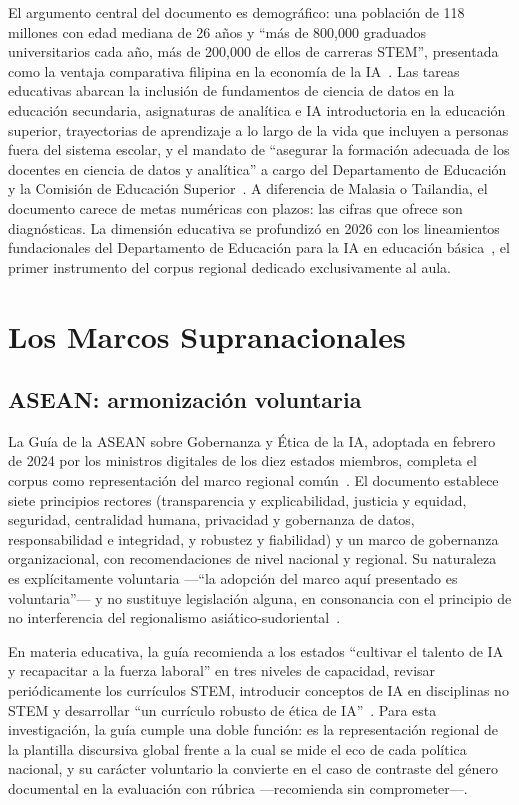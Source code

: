 El argumento central del documento es demográfico: una población de 118 millones con edad mediana de 26 años y ``más de 800,000 graduados universitarios cada año, más de 200,000 de ellos de carreras STEM'', presentada como la ventaja comparativa filipina en la economía de la IA~\citep{philippines2024naisr}. Las tareas educativas abarcan la inclusión de fundamentos de ciencia de datos en la educación secundaria, asignaturas de analítica e IA introductoria en la educación superior, trayectorias de aprendizaje a lo largo de la vida que incluyen a personas fuera del sistema escolar, y el mandato de ``asegurar la formación adecuada de los docentes en ciencia de datos y analítica'' a cargo del Departamento de Educación y la Comisión de Educación Superior~\citep{philippines2024naisr}. A diferencia de Malasia o Tailandia, el documento carece de metas numéricas con plazos: las cifras que ofrece son diagnósticas. La dimensión educativa se profundizó en 2026 con los lineamientos fundacionales del Departamento de Educación para la IA en educación básica~\citep{deped2026ai}, el primer instrumento del corpus regional dedicado exclusivamente al aula.


\section{Los Marcos Supranacionales}
\label{sec:marcos-supranacionales}

\subsection{ASEAN: armonización voluntaria}
\label{subsec:asean-contexto}

La Guía de la ASEAN sobre Gobernanza y Ética de la IA, adoptada en febrero de 2024 por los ministros digitales de los diez estados miembros, completa el corpus como representación del marco regional común~\citep{asean2024guide}. El documento establece siete principios rectores (transparencia y explicabilidad, justicia y equidad, seguridad, centralidad humana, privacidad y gobernanza de datos, responsabilidad e integridad, y robustez y fiabilidad) y un marco de gobernanza organizacional, con recomendaciones de nivel nacional y regional. Su naturaleza es explícitamente voluntaria —``la adopción del marco aquí presentado es voluntaria''— y no sustituye legislación alguna, en consonancia con el principio de no interferencia del regionalismo asiático-sudoriental~\citep{asean2024guide}.

En materia educativa, la guía recomienda a los estados ``cultivar el talento de IA y recapacitar a la fuerza laboral'' en tres niveles de capacidad, revisar periódicamente los currículos STEM, introducir conceptos de IA en disciplinas no STEM y desarrollar ``un currículo robusto de ética de IA''~\citep{asean2024guide}. Para esta investigación, la guía cumple una doble función: es la representación regional de la plantilla discursiva global frente a la cual se mide el eco de cada política nacional, y su carácter voluntario la convierte en el caso de contraste del género documental en la evaluación con rúbrica —recomienda sin comprometer—.

